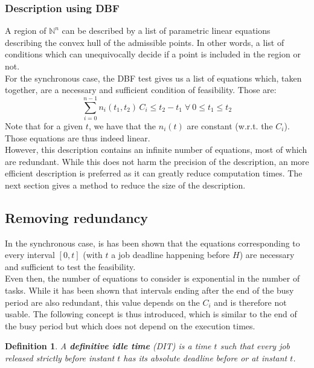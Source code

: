 \documentclass[times, 10pt,twocolumn, a4paper]{article}
\newtheorem{definition}{Definition}
\begin{document}

  \subsubsection{Description using DBF}

A region of $\mathbb{N}^n$ can be described by a list of parametric linear equations describing the convex hull of the admissible points. In other words, a list of conditions which can unequivocally decide if a point is included in the region or not.\\

For the synchronous case, the DBF test gives us a list of equations which, taken together, are a necessary and sufficient condition of feasibility. Those are:
$$\sum_{i=0}^{n-1} n_i(t_1, t_2) \, C_i \leq t_2 - t_1 \; \forall \: 0 \leq t_1 \leq t_2$$
Note that for a given $t$, we have that the $n_i(t)$ are constant (w.r.t. the $C_i$). Those equations are thus indeed linear.\\

However, this description contains an infinite number of equations, most of which are redundant. While this does not harm the precision of the description, an more efficient description is preferred as it can greatly reduce computation times. The next section gives a method to reduce the size of the description.

\subsection{Removing redundancy}

In the synchronous case, is has been shown that the equations corresponding to every interval $[0, t]$ (with $t$ a job deadline happening before $H$) are necessary and sufficient to test the feasibility.\\

Even then, the number of equations to consider is exponential in the number of tasks. While it has been shown that intervals ending after the end of the busy period are also redundant, this value depends on the $C_i$ and is therefore not usable. The following concept is thus introduced, which is similar to the end of the busy period but which does not depend on the execution times.

\begin{definition}
A \textbf{definitive idle time} (DIT) is a time $t$ such that every job released strictly before instant $t$ has its absolute deadline before or at instant $t$.
\end{definition}
\end{document}
